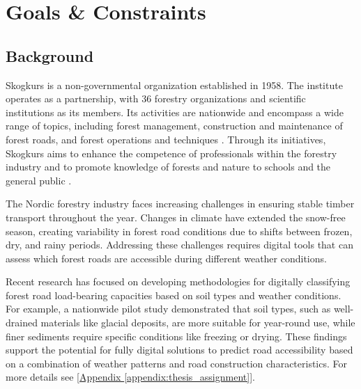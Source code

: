 \section{Goals \& Constraints}

\subsection{Background}

Skogkurs is a non-governmental organization established in 1958. The institute operates as a partnership, with 36 forestry organizations and scientific institutions as its members. Its activities are nationwide and encompass a wide range of topics, including forest management, construction and maintenance of forest roads, and forest operations and techniques \cite{skogkurs_eng}. Through its initiatives, Skogkurs aims to enhance the competence of professionals within the forestry industry and to promote knowledge of forests and nature to schools and the general public \cite{skogkurs_nor}. 

The Nordic forestry industry faces increasing challenges in ensuring stable timber transport throughout the year. Changes in climate have extended the snow-free season, creating variability in forest road conditions due to shifts between frozen, dry, and rainy periods. Addressing these challenges requires digital tools that can assess which forest roads are accessible during different weather conditions.

Recent research has focused on developing methodologies for digitally classifying forest road load-bearing capacities based on soil types and weather conditions. For example, a nationwide pilot study demonstrated that soil types, such as well-drained materials like glacial deposits, are more suitable for year-round use, while finer sediments require specific conditions like freezing or drying. These findings support the potential for fully digital solutions to predict road accessibility based on a combination of weather patterns and road construction characteristics. For more details see [\hyperref[appendix:thesis_assignment]{Appendix \ref*{appendix:thesis_assignment}}].

\begin{comment}
    Additionally, tools like HarvesterSeasons.com, developed by the Finnish Meteorological Institute, provide weekly forecasts of road conditions based on soil moisture, temperature, and snow depth. These forecasts use data from sources like NASA's SMAP and ESA's Sentinel-1 satellites to generate relative load-bearing predictions for winter and snow-free seasons. Such advancements aim to increase efficiency and reduce risks in forest operations under variable weather conditions [\ref{appendix:thesis_proposal}.
\end{comment}

